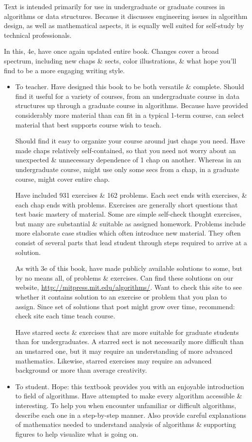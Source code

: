 \documentclass{article}
\begin{document}
\begin{itemize}
	Text is intended primarily for use in undergraduate or graduate courses in algorithms or data structures. Because it discusses engineering issues in algorithm design, as well as mathematical aspects, it is equally well suited for self-study by technical professionals.
	
	In this, 4e, have once again updated entire book. Changes cover a broad spectrum, including new chaps \& sects, color illustrations, \& what hope you'll find to be a more engaging writing style.
	\begin{itemize}
		\item {\sf To teacher.} Have designed this book to be both versatile \& complete. Should find it useful for a variety of courses, from an undergraduate course in data structures up through a graduate course in algorithms. Because have provided considerably more material than can fit in a typical 1-term course, can select material that best supports course wish to teach.
		
		Should find it easy to organize your course around just chaps you need. Have made chaps relatively self-contained, so that you need not worry about an unexpected \& unnecessary dependence of 1 chap on another. Whereas in an undergraduate course, might use only some secs from a chap, in a graduate course, might cover entire chap.
		
		Have included 931 exercises \& 162 problems. Each sect ends with exercises, \& each chap ends with problems. Exercises are generally short questions that test basic mastery of material. Some are simple self-check thought exercises, but many are substantial \& suitable as assigned homework. Problems include more elaborate case studies which often introduce new material. They often consist of several parts that lead student through steps required to arrive at a solution.
		
		As with 3e of this book, have made publicly available solutions to some, but by no means all, of problems \& exercises. Can find these solutions on our website, \url{http://mitpress.mit.edu/algorithms/}. Want to check this site to see whether it contains solution to an exercise or problem that you plan to assign. Since set of solutions that post might grow over time, recommend: check site each time teach course.
		
		Have starred sects \& exercises that are more suitable for graduate students than for undergraduates. A starred sect is not necessarily more difficult than an unstarred one, but it may require an understanding of more advanced mathematics. Likewise, starred exercises may require an advanced background or more than average creativity.
		\item {\sf To student.} Hope: this textbook provides you with an enjoyable introduction to field of algorithms. Have attempted to make every algorithm accessible \& interesting. To help you when encounter unfamiliar or difficult algorithms, describe each one in a step-by-step manner. Also provide careful explanations of mathematics needed to understand analysis of algorithms \& supporting figures to help visualize what is going on.
		

\end{itemize}
\end{itemize}
\end{document}
